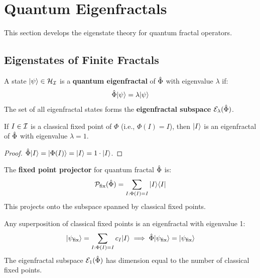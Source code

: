 \section{Quantum Eigenfractals}
\label{sec:quantum-eigenfractals}

This section develops the eigenstate theory for quantum fractal operators.

\subsection{Eigenstates of Finite Fractals}

\begin{definition}
\label{def:quantum-eigenfractal}
A state $|\psi\rangle \in \mathcal{H}_{\mathcal{I}}$ is a \textbf{quantum eigenfractal} of $\hat{\Phi}$ with eigenvalue $\lambda$ if:
\[
\hat{\Phi}|\psi\rangle = \lambda |\psi\rangle
\]
The set of all eigenfractal states forms the \textbf{eigenfractal subspace} $\mathcal{E}_\lambda(\hat{\Phi})$.
\end{definition}

\begin{theorem}
\label{thm:fixed-eigenstates}
If $I \in \mathcal{I}$ is a classical fixed point of $\Phi$ (i.e., $\Phi(I) = I$), then $|I\rangle$ is an eigenfractal of $\hat{\Phi}$ with eigenvalue $\lambda = 1$.
\end{theorem}

\begin{proof}
$\hat{\Phi}|I\rangle = |\Phi(I)\rangle = |I\rangle = 1 \cdot |I\rangle$.
\end{proof}

\begin{definition}
\label{def:fixed-projector}
The \textbf{fixed point projector} for quantum fractal $\hat{\Phi}$ is:
\[
\mathcal{P}_{\mathrm{fix}}(\hat{\Phi}) = \sum_{I : \Phi(I) = I} |I\rangle\langle I|
\]
This projects onto the subspace spanned by classical fixed points.
\end{definition}

\begin{proposition}
\label{prop:eigenfractal-super}
Any superposition of classical fixed points is an eigenfractal with eigenvalue 1:
\[
|\psi_{\mathrm{fix}}\rangle = \sum_{I : \Phi(I) = I} c_I |I\rangle \implies \hat{\Phi}|\psi_{\mathrm{fix}}\rangle = |\psi_{\mathrm{fix}}\rangle
\]
The eigenfractal subspace $\mathcal{E}_1(\hat{\Phi})$ has dimension equal to the number of classical fixed points.
\end{proposition}

